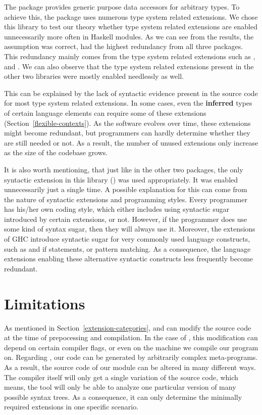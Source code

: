 \documentclass[main.tex]{subfiles}
\begin{document}
	The  package provides generic purpose data accessors for arbitrary types. To achieve this, the package uses numerous type system related extensions.	We chose this library to test our theory whether type system related extensions are enabled unnecessarily more often in Haskell modules. As we can see from the results, the assumption was correct,  had the highest redundancy from all three packages. This redundancy mainly comes from the type system related extensions such as ,  and . We can also observe that the type system related extensions present in the other two libraries were mostly enabled needlessly as well.
	
	This can be explained by the lack of syntactic evidence present in the source code for most type system related extensions. In some cases, even the \textbf{inferred} types of certain language elements can require some of these extensions (Section~\ref{flexible-contexts}). As the software evolves over time, these extensions might become redundant, but programmers can hardly determine whether they are still needed or not. As a result, the number of unused extensions only increase as the size of the codebase grows.
	
	It is also worth mentioning, that just like in the other two packages, the only syntactic extension in this library () was used appropriately. It was enabled unnecessarily just a single time. A possible explanation for this can come from the nature of syntactic extensions and programming styles. Every programmer has his/her own coding style, which either includes using syntactic sugar introduced by certain extensions, or not. However, if the programmer does use some kind of syntax sugar, then they will always use it. Moreover, the extensions of GHC introduce syntactic sugar for very commonly used language constructs, such as  and if  statements, or pattern matching. As a consequence, the language extensions enabling these alternative syntactic constructs less frequently become redundant.
	
	\section{Limitations}
	
	As mentioned in Section~\ref{extension-categories},  and  can modify the source code at the time of prepocessing and compilation. In the case of , this modification can depend on certain compiler flags, or even on the machine we compile our program on. Regarding , our code can be generated by arbitrarily complex meta-programs. As a result, the source code of our module can be altered in many different ways. The compiler itself will only get a single variation of the source code, which means, the tool will only be able to analyze one particular version of many possible syntax trees. As a consequence, it can only determine the minimally required extensions in one specific scenario.
	
\end{document}
